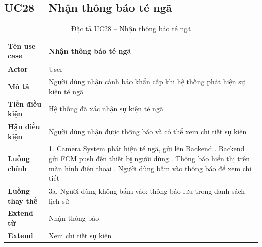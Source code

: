 \subsection*{UC28 -- Nhận thông báo té ngã}
\begin{table}[H]
    \captionsetup{justification=raggedright, singlelinecheck=false}
    \caption{Đặc tả UC28 -- Nhận thông báo té ngã}
\centering
\begin{tabular}{|p{3.5cm}|p{10cm}|}
\hline
\textbf{Tên use case} & Nhận thông báo té ngã \\
\hline
\textbf{Actor} & User \\
\hline
\textbf{Mô tả} & Người dùng nhận cảnh báo khẩn cấp khi
  hệ thống phát hiện sự kiện té ngã \\
\hline
\textbf{Tiền điều kiện} & Hệ thống đã xác nhận sự kiện
  té ngã \\
\hline
\textbf{Hậu điều kiện} & Người dùng nhận được thông báo
  và có thể xem chi tiết sự kiện \\
\hline
\textbf{Luồng chính} &
  1. Camera System phát hiện té ngã, gửi lên Backend \newline
  2. Backend gửi FCM push đến thiết bị người dùng \newline
  3. Thông báo hiển thị trên màn hình điện thoại \newline
  4. Người dùng bấm vào thông báo để xem chi tiết \\
\hline
\textbf{Luồng thay thế} &
  3a. Người dùng không bấm vào: thông báo
  lưu trong danh sách lịch sử \\
\hline
\textbf{Extend từ} & Nhận thông báo \\
\hline
\textbf{Extend} & Xem chi tiết sự kiện \\
\hline
\end{tabular}

\end{table}

